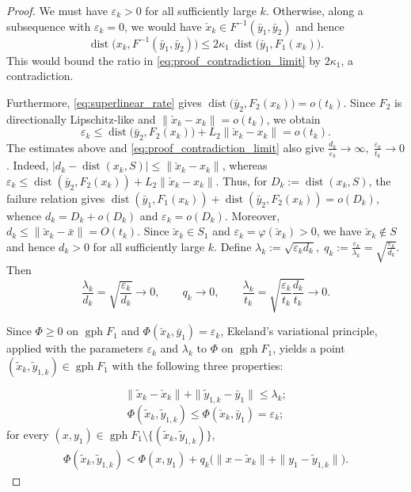 \documentclass[12pt,twoside,reqno]{amsart}
\theoremstyle{definition}
\numberwithin{equation}{section}
\begin{document}
\begin{proof}
We must have $\varepsilon_k > 0$ for all sufficiently large $k$. Otherwise, along a subsequence with $\varepsilon_k=0$, we would have $\check{x}_k \in F^{-1}(\bar{y}_1,\bar{y}_2)$ and hence
\[
    \operatorname{dist}\big(x_k,F^{-1}(\bar{y}_1,\bar{y}_2)\big)
    \le 2\kappa_1\,\operatorname{dist}\big(\bar{y}_1,F_1(x_k)\big).
\]
This would bound the ratio in \eqref{eq:proof_contradiction_limit} by $2\kappa_1$, a contradiction.

Furthermore, \eqref{eq:superlinear_rate} gives $\operatorname{dist}\big(\bar{y}_2, F_2(x_k)\big) = o(t_k)$. Since $F_2$ is directionally Lipschitz-like and $\|\check{x}_k-x_k\|=o(t_k)$, we obtain
\[
    \varepsilon_k
    \le \operatorname{dist}\big(\bar{y}_2,F_2(x_k)\big)
       +L_2\|\check{x}_k-x_k\|
    =o(t_k).
\]
The estimates above and \eqref{eq:proof_contradiction_limit} also give $\frac{d_k}{\varepsilon_k}\to\infty,\; \frac{\varepsilon_k}{t_k}\to0$. 
Indeed, $|d_k-\operatorname{dist}(x_k,S)|\le\|\check x_k-x_k\|$, whereas $\varepsilon_k\le
    \operatorname{dist}(\bar{y}_2,F_2(x_k))
    +L_2\|\check x_k-x_k\|$. Thus, for $D_k:=\operatorname{dist}(x_k,S)$, the failure relation gives $\operatorname{dist}(\bar{y}_1,F_1(x_k))+\operatorname{dist}(\bar{y}_2,F_2(x_k))=o(D_k)$, whence $d_k=D_k+o(D_k)$ and $\varepsilon_k=o(D_k)$.
Moreover, $d_k\le\|\check x_k-\bar{x}\|=O(t_k)$. Since
$\check x_k\in S_1$ and $\varepsilon_k=\varphi(\check x_k)>0$, we have
$\check x_k\notin S$ and hence $d_k>0$ for all sufficiently large $k$.
Define $\lambda_k:=\sqrt{\varepsilon_kd_k},\;
    q_k:=\frac{\varepsilon_k}{\lambda_k}
        =\sqrt{\frac{\varepsilon_k}{d_k}}$.  Then
\begin{equation}\label{eq:ekeland_parameter_limits}
    \frac{\lambda_k}{d_k}
        =\sqrt{\frac{\varepsilon_k}{d_k}}\to0,
    \qquad
    q_k\to0,
    \qquad
    \frac{\lambda_k}{t_k}
        =\sqrt{\frac{\varepsilon_k}{t_k}\frac{d_k}{t_k}}\to0.
\end{equation}

Since $\Phi\ge0$ on $\operatorname{gph}F_1$ and
$\Phi(\check x_k,\bar{y}_1)=\varepsilon_k$, Ekeland's variational
principle, applied with the parameters $\varepsilon_k$ and $\lambda_k$
to $\Phi$ on $\operatorname{gph}F_1$, yields a point
$(\tilde x_k,\tilde y_{1,k})\in\operatorname{gph}F_1$ with the following
three properties:

\begin{equation}\label{eq:ekeland_proximity}
    \|\tilde x_k-\check x_k\|
       +\|\tilde y_{1,k}-\bar{y}_1\|\le\lambda_k;
\end{equation}
\begin{equation}\label{eq:ekeland_value}
    \Phi(\tilde x_k,\tilde y_{1,k})
       \le \Phi(\check x_k,\bar{y}_1)=\varepsilon_k;
\end{equation}
for every
$(x,y_1)\in\operatorname{gph}F_1\setminus
\{(\tilde x_k,\tilde y_{1,k})\}$,
\begin{equation}\label{eq:ekeland_variational_inequality}
\begin{aligned}
    \Phi(\tilde x_k,\tilde y_{1,k})
    <{}\Phi(x,y_1)+q_k\bigl(\|x-\tilde x_k\|+\|y_1-\tilde y_{1,k}\|\bigr).
\end{aligned}
\end{equation}



\end{proof}
\end{document}
